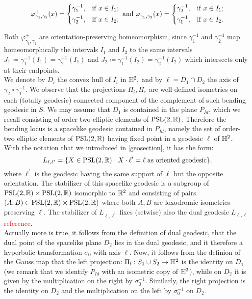 \begin{equation}
    \varphi_{\gamma_1,\gamma_2}^+(x) = \begin{dcases}
        \gamma_1^{-1}, & \text{if } x \in I_1; \\
        \gamma_2^{-1}, & \text{if } x \in I_2;
    \end{dcases}
    \;\text{and}\;
    \varphi^-_{\gamma_1,\gamma_2}(x) = \begin{dcases}
        \gamma_2^{-1}, & \text{if } x \in I_1 ;\\
        \gamma_1^{-1} , & \text{if } x \in I_2.
    \end{dcases}
    \end{equation}
    
Both $\varphi_{\gamma_1,\gamma_2}^{\pm}$ are orientation-preserving homeomorphism, since $\gamma_1^{-1}$ and $\gamma_2^{-1}$ map homeomorphically the intervals $I_1$ and $I_2$ to the same intervals $J_1\coloneqq\gamma_1^{-1}(I_1)=\gamma_2^{-1}(I_1)$ and $J_2\coloneqq\gamma_1^{-1}(I_2)=\gamma_2^{-1}(I_2)$ which intersects only at their endpoints. \\
We denote by $D_i$ the convex hull of $I_i$ in $\mathbb{H}^2,$ and by $\ell=D_1\cap D_2$ the axis of $\gamma_2\circ\gamma_1^{-1}$. 
We observe that the projections $\Pi_l, \Pi_r$ are well defined isometries on each (totally geodesic) connected component of the complement of such bending geodesic in $S$. We may assume that $D_1$ is contained in the plane $P_{Id}$, which we recall consisting of order two-elliptic elements of $\text{PSL}(2,\mathbb{R})$. Therefore the bending locus is a spacelike geodesic contained in $P_{Id}$, namely the set of order-two elliptic elements of $\text{PSL}(2,\mathbb{R})$ having fixed point in a geodesic $\ell$ of $\mathbb{H}^2$. \\ 
With the notation that we introduced in \ref{geosection}, it has the form: 
\[
    L_{\ell,\ell^{\prime}}=\{X\in\text{PSL}(2,\mathbb{R})\;|\;X\cdot\ell^{\prime} =\ell\; \text{as oriented geodesic}\}, 
\]
where $\ell^{\prime}$ is the geodesic having the same support of $\ell$ but the opposite orientation. The stabilizer of this spacelike geodesic is a subgroup of $\text{PSL}(2,\mathbb{R})\times\text{PSL}(2,\mathbb{R})$ isomorphic to $\mathbb{R}^2$ and consisting of pairs $(A,B)\in\text{PSL}(2,\mathbb{R})\times\text{PSL}(2,\mathbb{R})$ where both $A,B$ are loxodromic isometries preserving $\ell$. The stabilizer of $L_{\ell,\ell^{\prime}}$ fixes (setwise) also the dual geodesic $L_{\ell,\ell}$ \textcolor{red}{reference}. \\
Actually more is true, it follows from the definition of dual geodesic, that the dual point of the spacelike plane $D_2$ lies in the dual geodesic, and it therefore a hyperbolic transformation $\sigma_0$ with axis $\ell$. Now, it follows from the definion of the Gauss map that the left projection: \(\Pi_l:S_1\cup S_2\to\mathbb{H}^2\) is the identity on $D_1$ (we remark that we identify $P_{Id}$ with an isometric copy of $\mathbb{H}^2$), while on $D_2$ it is given by the multiplication on the right by $\sigma_0^{-1}$. Similarly, the right projection is the identity on $D_2$ and the multiplication on the left by $\sigma_0^{-1}$ on $D_2$.\\
